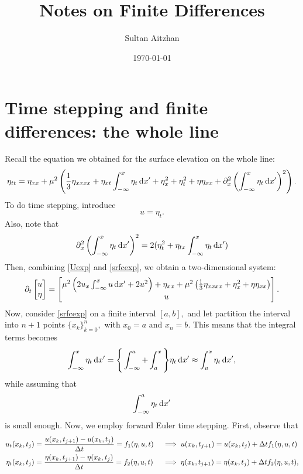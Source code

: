 \documentclass[10pt,reqno,oneside,a4paper, landscape]{article}
\author{Sultan Aitzhan}
\title{Notes on Finite Differences}
\date{\today}
\begin{document}
\maketitle
\thispagestyle{fancy}
\tableofcontents


\section{Time stepping and finite differences: the whole line}

Recall the equation we obtained for the surface elevation on the whole line:
\begin{equation}\label{srfcexp}
\eta_{tt} = \eta_{xx} + \mu^2\left( \frac{1}{3} \eta_{xxxx} + \eta_{xt} \int^{x}_{-\infty} \eta_t \,\mathrm{d} x' + \eta^2_x + \eta^2_t +\eta \eta_{xx} + \partial_x^2 \left(\int^{x}_{-\infty} \eta_t \,\mathrm{d} x' \right)^2 \right).
\end{equation}
To do time stepping, introduce
\begin{equation}\label{Uexp}
u = \eta_t.
\end{equation}
Also, note that 
\[ 
\partial_x^2 \left(\int^{x}_{-\infty} \eta_t \,\mathrm{d} x' \right)^2 = 2(\eta_t^2 + \eta_{tx} \int^x_{-\infty}\eta_t \,\mathrm{d} x')
\]
Then, combining \eqref{Uexp} and \eqref{srfcexp}, we obtain a two-dimensional system:
\begin{equation}\label{systemeq1}
  \partial_t \begin{bmatrix} u \\ \eta \end{bmatrix} =
  \begin{bmatrix} 
  \mu^2\left(2 u_{x} \int^{x}_{-\infty} u \,\mathrm{d} x' +2 u^2 \right) + \eta_{xx} + \mu^2 \left( \frac{1}{3} \eta_{xxxx} + \eta^2_x + \eta\eta_{xx} \right) \\
  u \end{bmatrix}.
\end{equation}
Now, consider \eqref{srfcexp} on a finite interval $[a,b],$ and let partition the interval into $n+1$ points $\{ x_k\}^n_{k=0},$ with $x_0 = a$ and $x_n = b.$ This means that the integral terms becomes
\[ 
\int^{x}_{-\infty} \eta_t \,\mathrm{d} x' = \Bigg\{\int^{a}_{-\infty} + \int^x_a \Bigg\} \eta_t \,\mathrm{d} x' \approx \int^x_a \eta_t \,\mathrm{d} x', 
\]
while assuming that 
\[ \int^{a}_{-\infty}  \eta_t \,\mathrm{d} x' \]
is small enough. Now, we employ forward Euler time stepping. First, observe that
\begin{align*}
u_t(x_k, t_j) &= \frac{u(x_k, t_{j+1}) - u(x_k, t_j)}{\Delta t} = f_1(\eta, u, t) &&\implies u(x_k, t_{j+1}) = u(x_k, t_j) + \Delta t f_1(\eta, u, t) \\
\eta_t(x_k, t_j) &= \frac{\eta(x_k, t_{j+1}) - \eta(x_k, t_j)}{\Delta t} = f_2(\eta, u, t) &&\implies \eta(x_k, t_{j+1}) =  \eta(x_k, t_j)+ \Delta t f_2(\eta, u, t), 
\end{align*}
\end{document}
